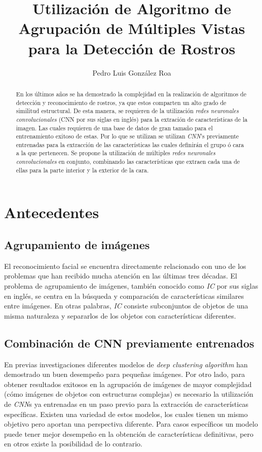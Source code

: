 \documentclass[a4paper, 10pt, conference]{ieeeconf}      %
\title{\LARGE \bf
    Utilización de Algoritmo de Agrupación de Múltiples Vistas
    para la Detección de Rostros
}
\author{Pedro Luis González Roa}
\begin{document}
    \maketitle
    \thispagestyle{empty}
    \pagestyle{empty}

    \begin{abstract}
        En los últimos años se ha demostrado la complejidad en la realización de
        algoritmos de detección y reconocimiento de rostros, ya que estos comparten
        un alto grado de similitud estructural. De esta manera, se requieren de la
        utilización \textit{redes neuronales convolucionales} (CNN por sus siglas
        en inglés) para la extración de características de la imagen.
        Las cuales requieren de una base de datos de gran tamaño para el
        entrenamiento exitoso de estas. Por lo que se utilizan se utilizan
        \textit{CNN}'s previamente entrenadas para la extracción de las características
        las cuales definirán el grupo ó cara a la que pertenecen. Se propone la
        utilización de múltiples \textit{redes neuronales convolucionales} en conjunto,
        combinando las características que extraen cada una de ellas para la parte
        interior y la exterior de la cara.
    \end{abstract}

    \section{Antecedentes}

    \subsection{Agrupamiento de imágenes}
    El reconocimiento facial se encuentra directamente relacionado con uno de los
    problemas que han recibido mucha atención en las últimas tres décadas. El problema
    de agrupamiento de imágenes, también conocido como \textit{IC} por sus siglas
    en inglés, se centra en la búsqueda y comparación de características similares
    entre imágenes. En otras palabras, \textit{IC} consiste subconjuntos de objetos de
    una misma naturaleza y separarlos de los objetos con características diferentes.
    \cite{CombiningCNN}

    \subsection{Combinación de CNN previamente entrenados}
    En previas investigaciones diferentes modelos de \textit{deep clustering algorithm}
    han demostrado un buen desempeño para pequeñas imágenes. Por otro lado, para
    obtener resultados exitosos en la agrupación de imágenes de mayor complejidad
    (cómo imágenes de objetos con estructuras complejas) es necesario la utilización
    de \textit{CNN}s ya entrenadas en un paso previo para la extracción de
    características específicas. Existen una variedad de estos modelos, los cuales
    tienen un mismo objetivo pero aportan una perspectiva diferente. Para casos
    específicos un modelo puede tener mejor desempeño en la obtención de
    características definitivas, pero en otros existe la posibilidad de lo
    contrario. \cite{CombiningCNN}
\end{document}
